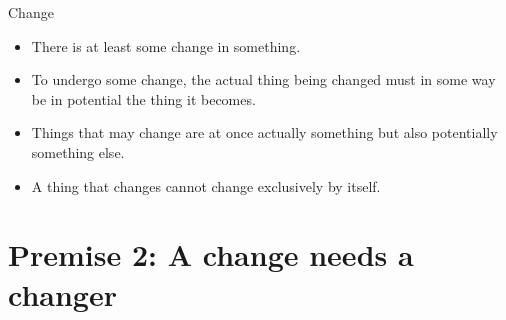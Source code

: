 \documentclass[xcolor=dvipsnames]{beamer}
\begin{document}
\begin{frame}[fragile]{Change}
  \begin{itemize}
  \item There is at least some change in something. \vspace{5mm}
  \item To undergo some change, the actual thing being changed must in some way be in potential the thing it becomes. \vspace{5mm}
  \item Things that may change are at once actually something but also potentially something else. \vspace{5mm}
  \item A thing that changes cannot change exclusively by itself. \vspace{5mm}
  \end{itemize}
\end{frame}


\section{Premise 2: A change needs a changer}
\end{document}
